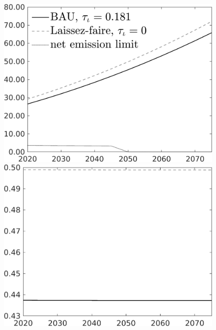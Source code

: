 \documentclass[12pt]{article}
\begin{document}
\begin{figure}[h!!]
\begin{minipage}[]{0.32\textwidth}
	\end{minipage}	
	\begin{minipage}[]{0.32\textwidth}
		\includegraphics[width=1\textwidth]{../../codding_model/own_basedOnFried/optimalPol_010922_revision/figures/all_13Sept22/CompTaul_LFBAU_Reg0_Emnet_spillover0_nsk0_xgr1_knspil1_sep1_countec0_GovRev0_etaa0.79_lgd1.png}
	\end{minipage}	
	\begin{minipage}[]{0.32\textwidth}
		\includegraphics[width=1\textwidth]{../../codding_model/own_basedOnFried/optimalPol_010922_revision/figures/all_13Sept22/CompTaul_LFBAU_Reg0_hh_spillover0_nsk0_xgr1_knspil1_sep1_countec0_GovRev0_etaa0.79_lgd0.png}

\end{minipage}
\end{figure}
\end{document}
